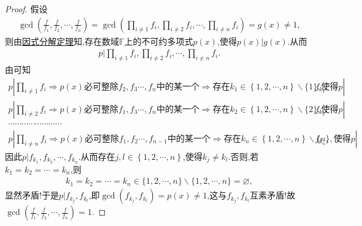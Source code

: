 \documentclass[../../main.tex]{subfiles}%
\begin{document}
\begin{proof}

假设
\begin{align*}
\gcd\left( \frac{f}{f_1},\frac{f}{f_2},\cdots ,\frac{f}{f_n} \right) =\gcd\left( \prod_{i\ne 1}{f_i},\prod_{i\ne 2}{f_i},\cdots ,\prod_{i\ne n}{f_i} \right) =g(x)\ne 1,
\end{align*}
则由\hyperref[theorem:因式分解定理]{因式分解定理}知,存在数域$\mathbb{F}$上的不可约多项式$p(x)$,使得$p(x)|g(x)$.从而
\begin{align*}
p|\prod_{i\ne 1}{f_i},\prod_{i\ne 2}{f_i},\cdots ,\prod_{i\ne n}{f_i}.
\end{align*}
由可知
\begin{gather}
p|\prod_{i\ne 1}{f_i}\Longrightarrow p\left( x \right) \text{必可整除}f_2,f_3\cdots ,f_n\text{中的某一个}\Longrightarrow \text{存在}k_1\in \left\{ 1,2,\cdots ,n \right\}\backslash \{1\} ,\text{使得}p|f_{k_1},\nonumber 
\\
p|\prod_{i\ne 2}{f_i}\Longrightarrow p\left( x \right) \text{必可整除}f_1,f_3\cdots ,f_n\text{中的某一个}\Longrightarrow \text{存在}k_2\in \left\{ 1,2,\cdots ,n \right\}\backslash \{2\} ,\text{使得}p|f_{k_2},
\nonumber \\
\cdots \cdots \cdots \cdots \cdots \cdots \cdots \cdots 
\nonumber \\
p|\prod_{i\ne n}{f_i}\Longrightarrow p\left( x \right) \text{必可整除}f_1,f_2\cdots ,f_{n-1}\text{中的某一个}\Longrightarrow \text{存在}k_n\in \left\{ 1,2,\cdots ,n \right\}\backslash \{n\}  ,\text{使得}p|f_{k_n},\nonumber
\end{gather}
因此$p|f_{k_1},f_{k_2},\cdots,f_{k_n}$.从而存在$j,l\in \left\{ 1,2,\cdots,n \right\}$,使得$k_j\ne k_l$.否则,若$k_1=k_2=\cdots=k_n$,则\begin{align*}
k_1=k_2=\cdots=k_n\in \{1,2,\cdots,n\}\backslash \{1,2,\cdots,n\}=\varnothing,
\end{align*}
显然矛盾!于是$p|f_{k_j},f_{k_l}$,即$\gcd(f_{k_j},f_{k_l})=p(x)\ne 1$,这与$f_{k_j},f_{k_l}$互素矛盾!故$\gcd\left( \frac{f}{f_1},\frac{f}{f_2},\cdots ,\frac{f}{f_n} \right) =1$.


\end{proof}
\end{document}
